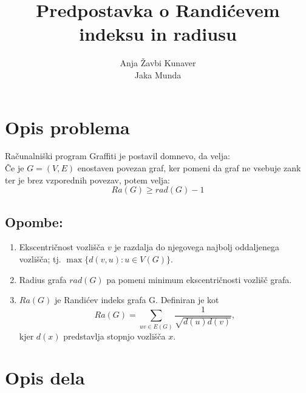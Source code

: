 \documentclass[a4paper, 10pt]{article}
\begin{document}
\title{Predpostavka o Randićevem indeksu in radiusu}
\author{Anja Žavbi Kunaver\\Jaka Munda}

\maketitle

\section{Opis problema}
Računalniški program Graffiti je postavil domnevo, da velja: \\
Če je $G=(V, E)$ enostaven povezan graf, ker pomeni da graf ne vsebuje zank ter je brez vzporednih povezav, potem velja: $$ Ra(G) \geq rad(G) -1$$


\subsection*{Opombe:}
\begin{enumerate}
\item
Ekscentričnost vozlišča $v$ je razdalja do njegovega najbolj oddaljenega vozlišča; tj. $\max \{d(v,u) : u \in V(G) \}$.
\item Radius grafa $rad(G)$ pa pomeni minimum ekscentričnosti vozlišč grafa.
\item
$Ra(G)$ je Randićev indeks grafa G. Definiran je kot
$$Ra(G) = \sum_{uv \in E(G)} \frac{1}{\sqrt{d(u) d(v)}},$$
kjer $d(x)$ predstavlja stopnjo vozlišča $x$.
\end{enumerate}



\section{Opis dela}
\end{document}
